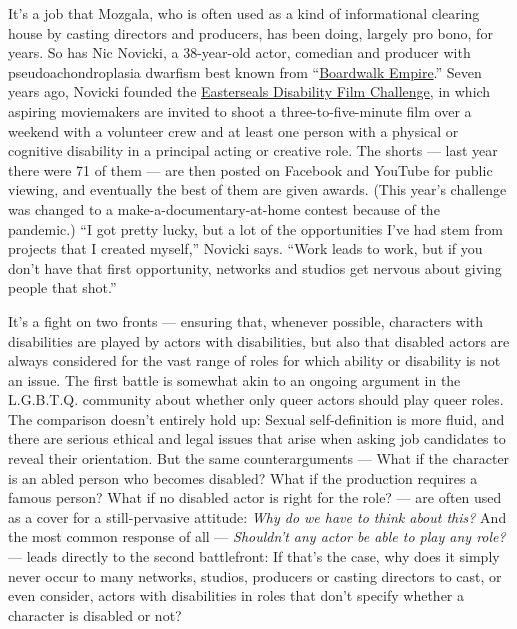 It's a job that Mozgala, who is often used as a kind of informational
clearing house by casting directors and producers, has been doing,
largely pro bono, for years. So has Nic Novicki, a 38-year-old actor,
comedian and producer with pseudoachondroplasia dwarfism best known from
``\href{https://www.nytimes3xbfgragh.onion/watching/recommendations/watching-tv-boardwalk-empire2}{Boardwalk
Empire}.'' Seven years ago, Novicki founded the
\href{https://disabilityfilmchallenge.com/}{Easterseals Disability Film
Challenge}, in which aspiring moviemakers are invited to shoot a
three-to-five-minute film over a weekend with a volunteer crew and at
least one person with a physical or cognitive disability in a principal
acting or creative role. The shorts --- last year there were 71 of them
--- are then posted on Facebook and YouTube for public viewing, and
eventually the best of them are given awards. (This year's challenge was
changed to a make-a-documentary-at-home contest because of the
pandemic.) ``I got pretty lucky, but a lot of the opportunities I've had
stem from projects that I created myself,'' Novicki says. ``Work leads
to work, but if you don't have that first opportunity, networks and
studios get nervous about giving people that shot.''

It's a fight on two fronts --- ensuring that, whenever possible,
characters with disabilities are played by actors with disabilities, but
also that disabled actors are always considered for the vast range of
roles for which ability or disability is not an issue. The first battle
is somewhat akin to an ongoing argument in the L.G.B.T.Q. community
about whether only queer actors should play queer roles. The comparison
doesn't entirely hold up: Sexual self-definition is more fluid, and
there are serious ethical and legal issues that arise when asking job
candidates to reveal their orientation. But the same counterarguments
--- What if the character is an abled person who becomes disabled? What
if the production requires a famous person? What if no disabled actor is
right for the role? --- are often used as a cover for a still-pervasive
attitude: \emph{Why do we have to think about this?} And the most common
response of all --- \emph{Shouldn't any actor be able to play any role?}
--- leads directly to the second battlefront: If that's the case, why
does it simply never occur to many networks, studios, producers or
casting directors to cast, or even consider, actors with disabilities in
roles that don't specify whether a character is disabled or not?

